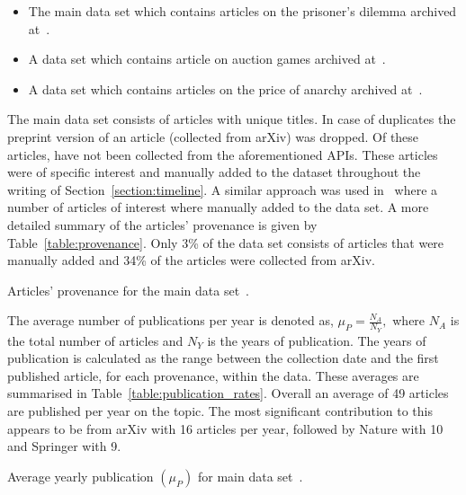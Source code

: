 \documentclass{article}
\theoremstyle{definition}
\newcommand{\totalarticles}{}
\newcommand{\manual}{}
\begin{document}
\begin{itemize}
    \item The main data set which contains articles on the prisoner's dilemma archived at~\cite{pd_data_2018}.
    \item A data set which contains article on auction games archived at~\cite{auction_data_2018}.
    \item A data set which contains articles on the price of anarchy archived at~\cite{anarchy_data_2018}.
\end{itemize}

The main data set
consists of \totalarticles articles with unique titles. In case of duplicates
the preprint version of an article (collected from arXiv) was dropped.
Of these \totalarticles articles, \manual have not been collected from the
aforementioned APIs. These articles were of specific interest and manually added
to the dataset throughout the writing of Section~\ref{section:timeline}. A
similar approach was used in~\cite{Liu2015} where a number of articles of interest
where manually added to the data set. A more
detailed summary of the articles' provenance is given by Table~\ref{table:provenance}.
Only 3\% of the data set consists of articles that were manually added and 34\% of the
articles were collected from arXiv.

\begin{table}[!hbtp]
    \begin{center}
    
    \end{center}
    \caption{Articles' provenance for the main data set~\cite{pd_data_2018}.}
    \label{table:provenance}
\end{table}

The average number of publications per year is denoted as, \(\mu_P =
\frac{N_A}{N_Y},\) where \(N_A\) is the total number of articles and \(N_Y\) is
the years of publication. The years of publication is calculated as the range
between the collection date and the first published article, for each
provenance, within the data. These averages are summarised in
Table~\ref{table:publication_rates}. Overall an average of 49 articles are
published per year on the topic. The most significant contribution to this
appears to be from arXiv with 16 articles per year, followed by Nature with 10
and Springer with 9.

\begin{table}[!hbtp]
    \begin{center}
    
    \end{center}
    \caption{Average yearly publication $(\mu_P)$ for main data set~\cite{pd_data_2018}.}
    \label{table:publication_rates}
\end{table}
\end{document}
